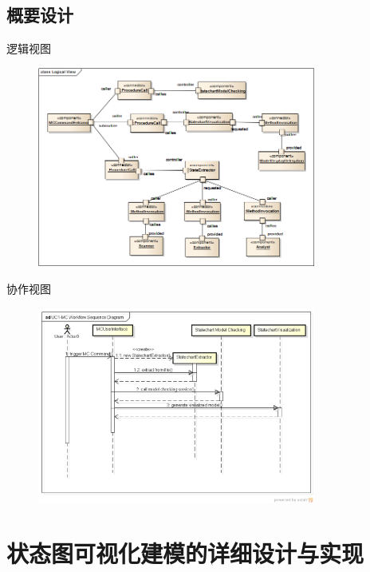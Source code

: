 \documentclass{beamer}
\begin{document}
\subsection{概要设计}
\begin{frame}{逻辑视图}
  \begin{figure}[H]
  \includegraphics[width=3.6in]{img/3.bmp}
  \end{figure}
\end{frame}
\begin{frame}{协作视图}
  \begin{figure}[H]
  \includegraphics[width=3.6in]{img/4.PNG}
  \end{figure}
\end{frame}

\section{状态图可视化建模的详细设计与实现}
\end{document}
